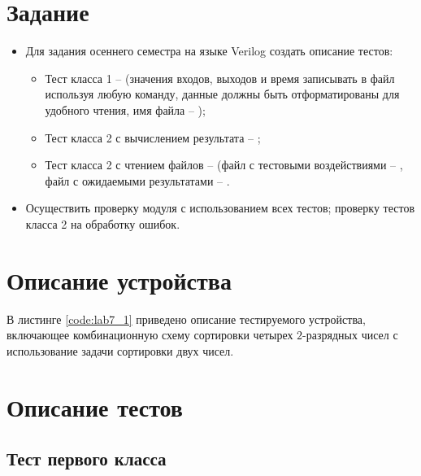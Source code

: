 





\tableofcontents
\lstlistoflistings
\listoffigures
\newpage

\section{Задание}

\begin{itemize}
	\item Для задания  осеннего семестра на языке Verilog создать описание тестов:
		\begin{itemize}
			\item Тест класса 1 --  (значения входов, выходов и время записывать в файл используя любую команду, данные должны быть отформатированы для удобного чтения, имя файла -- );
			\item Тест класса 2 с вычислением результата -- ;
			\item Тест класса 2 с чтением файлов --  (файл с тестовыми воздействиями -- , файл с ожидаемыми результатами -- .
		\end{itemize}

	\item Осуществить проверку модуля с использованием всех тестов; проверку тестов класса 2 на обработку ошибок.
\end{itemize}

\section{Описание устройства}

В листинге \ref{code:lab7_1} приведено описание тестируемого устройства, включающее комбинационную схему сортировки четырех $2$-разрядных чисел с использование задачи сортировки двух чисел.


\section{Описание тестов}
\label{sec:tests}

\subsection{Тест первого класса}

